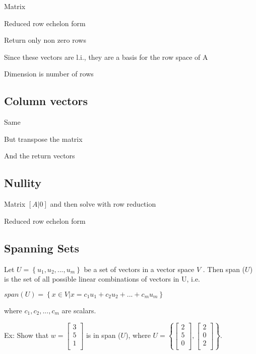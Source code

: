 \documentclass{extarticle}
\begin{document}
\begin{multicols}{4}
Matrix

Reduced row echelon form

Return only non zero rows

Since these vectors are l.i., they are a basis for the row space of A

Dimension is number of rows




\subsection{Column vectors}

Same

But transpose the matrix

And the return vectors



\subsection{Nullity}

Matrix $[A|0]$
and then solve with row reduction

Reduced row echelon form








\begin{tcolorbox}[enhanced jigsaw,sharp corners,coltext=black,colback=BurntOrange!25!white,boxrule=0pt,breakable,size=minimal]

\subsection{Spanning Sets}
Let $U = \left\{u_1,u_2,...,u_m\right\}$ be a set of vectors in a vector space $V$ . Then span ($U$) is the set of all possible linear combinations of vectors in U, i.e.

$span (U) = \left\{x \in V | x = c_1u_1 + c_2u_2 + ... + c_mu_m \right\}$

where $c_1, c_2,...,c_m$ are scalars.

Ex: Show that $w = \left[ \begin{matrix}3\\5\\1\\\end{matrix} \right]$ is in span ($U$), where $U = \left\{ \left[ \begin{matrix}2\\5\\0\\\end{matrix}\right], \left[ \begin{matrix}2\\0\\2\\\end{matrix}\right] \right\} $.


\end{tcolorbox}
\end{multicols}
\end{document}
